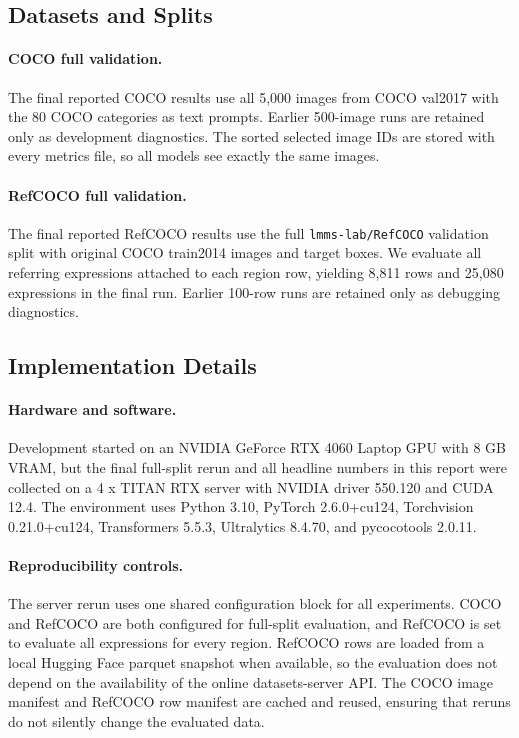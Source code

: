 \documentclass[conference]{IEEEtran}
\begin{document}
\subsection{Datasets and Splits}

\paragraph{COCO full validation.}
The final reported COCO results use all 5,000 images from COCO val2017 with the
80 COCO categories as text prompts. Earlier 500-image runs are retained only as
development diagnostics. The sorted selected image IDs are stored with every
metrics file, so all models see exactly the same images.

\paragraph{RefCOCO full validation.}
The final reported RefCOCO results use the full
\texttt{lmms-lab/RefCOCO} validation split with original COCO train2014 images
and target boxes. We evaluate all referring expressions attached to each region
row, yielding 8,811 rows and 25,080 expressions in the final run. Earlier
100-row runs are retained only as debugging diagnostics.

\subsection{Implementation Details}

\paragraph{Hardware and software.}
Development started on an NVIDIA GeForce RTX 4060 Laptop GPU with 8 GB VRAM,
but the final full-split rerun and all headline numbers in this report were
collected on a 4 x TITAN RTX server with NVIDIA driver 550.120 and CUDA 12.4.
The environment uses Python 3.10, PyTorch 2.6.0+cu124, Torchvision 0.21.0+cu124,
Transformers 5.5.3, Ultralytics 8.4.70, and
pycocotools 2.0.11.

\paragraph{Reproducibility controls.}
The server rerun uses one shared configuration block for all experiments.
COCO and RefCOCO are both configured for full-split evaluation, and RefCOCO is
set to evaluate all expressions for every region. RefCOCO rows are loaded from a local
Hugging Face parquet snapshot when available, so the evaluation does not depend
on the availability of the online datasets-server API. The COCO image manifest
and RefCOCO row manifest are cached and reused, ensuring that reruns do not
silently change the evaluated data.
\end{document}

